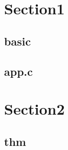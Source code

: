 \section{Section1}
    \subsection{basic}
        
    \subsection{app.c}
        
\section{Section2}
    \subsection{thm}
        